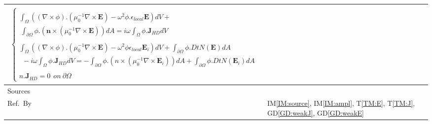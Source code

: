 \documentclass[12pt]{article}
\newcommand{\colBwidth}{0.82\textwidth} \newcommand{\colCwidth}{0.1\textwidth}
\begin{document}
\begin{minipage}{\textwidth}
\begin{tabular}{| p{\colAwidth} |
				p{\colBwidth}|}
\begin{equation}
\begin{gathered}
\begin{cases}
						 \\ \int_\Omega ((\nabla \times \phi) . (\mu^{-1}_0 \nabla \times \textbf{E})-\omega^2 \phi.\epsilon_{local} \textbf{E}) dV + \\ \ \int_{\partial \Omega} \phi.(\textbf{n} \times (\mu^{-1}_0 \nabla \times \textbf{E}))dA = i\omega \int_\Omega \phi. \textbf{J}_{HD} dV
						
						\\ \\ \int_\Omega ((\nabla \times \phi).(\mu^{-1}_{0} \nabla \times
						\textbf{E})- \omega^2\phi \epsilon_{local} \textbf{E}_i)dV + \int_{\partial
							\Omega} \phi . DtN(\textbf{E})dA\\ \ \ - i\omega \int_\Omega \phi .
						\textbf{J}_{HD}dV =  -\int_{\partial \Omega} \phi.(n \times (\mu^{-1}_0
						\nabla \times \textbf{E}_i))dA + \int_{\partial \Omega}
						\phi.DtN(\textbf{E}_i)dA
						\\
						\\ n.\textbf{J}_{HD}=0 \ \ on \ \partial \Omega \end{cases} \end{gathered} 
			\end{equation} \\
			\hline Sources& \cite{hiremath2012numerical}\\ 
			\hline 
			Ref.\ By & IM\ref{IM:source}, IM\ref{IM:ampl}, T\ref{TM:E}, T\ref{TM:J}, GD\ref{GD:weakJ}, GD\ref{GD:weakE} 
			\\ \hline
	\end{tabular} \end{minipage}\\
	
	
	
	~\newline
	
	
	
\end{document}
